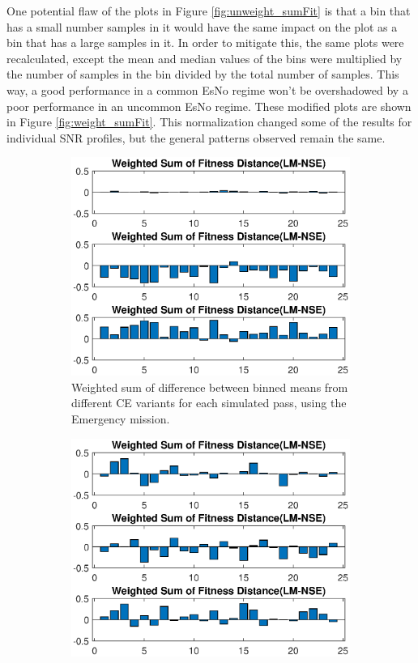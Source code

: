 \par One potential flaw of the plots in Figure \ref{fig:unweight_sumFit} is that a bin that has a small number samples in it would have the same impact on the plot as a bin that has a large samples in it. In order to mitigate this, the same plots were recalculated, except the mean and median values of the bins were multiplied by the number of samples in the bin divided by the total number of samples. This way, a good performance in a common EsNo regime won't be overshadowed by a poor performance in an uncommon EsNo regime. These modified plots are shown in Figure \ref{fig:weight_sumFit}. This normalization changed some of the results for individual SNR profiles, but the general patterns observed remain the same.
\begin{figure}[ht!]

\begin{subfigure}{0.55\linewidth}
	\centering
	\includegraphics[scale=0.6]{figures/c_sim_results/emer_weighted_sumFitness.eps}
	\caption{Weighted sum of difference between binned means from different CE variants for each simulated pass, using the Emergency mission.}
	\label{fig:cSimWeightEmer}
\end{subfigure}%
\begin{subfigure}{0.55\linewidth}
	\centering
	\includegraphics[scale=0.6]{figures/c_sim_results/coop_weighted_sumFitness.eps}

\end{subfigure}
\end{figure}
